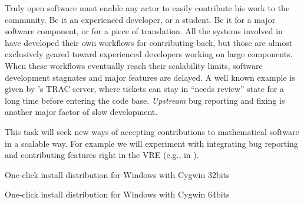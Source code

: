 \begin{workpackage}[id=component-architecture,wphases=3-24!.5,
  title=Component Architecture,lead=UV,
  PSRM=24,UVRM=1,SARM=1, USHRM=4]
\begin{tasklist}
  \begin{task}[title=Improving the development workflow in mathematical software.]
    Truly open software must enable any actor to easily contribute his
    work to the community. Be it an experienced developer, or a
    student. Be it for a major software component, or for a piece of
    translation. All the systems involved in \TheProject have
    developed their own workflows for contributing back, but those are
    almost exclusively geared toward experienced developers working on
    large components. When these workflows eventually reach their
    scalability limits, software development stagnates and major
    features are delayed. A well known example is given by \Sage's TRAC
    server, where tickets can stay in ``needs review'' state for a
    long time before entering the code base.  \emph{Upstream} bug
    reporting and fixing is another major factor of slow development.

    This task will seek new ways of accepting contributions to
    mathematical software in a scalable way. For example we will
    experiment with integrating bug reporting and contributing
    features right in the VRE (e.g., in \SMC).
  \end{task}
\end{tasklist}

  \begin{wpdelivs}
    \begin{wpdeliv}[due=12,id=portability-cygwin32,dissem=PU,nature=DEM]
      {One-click install \Sage distribution for Windows with Cygwin 32bits}
    \end{wpdeliv}%

    \begin{wpdeliv}[due=24,id=portability-cygwin64,dissem=PU,nature=DEM]
      {One-click install \Sage distribution for Windows with Cygwin 64bits}


\end{wpdeliv}
\end{wpdelivs}
\end{workpackage}
